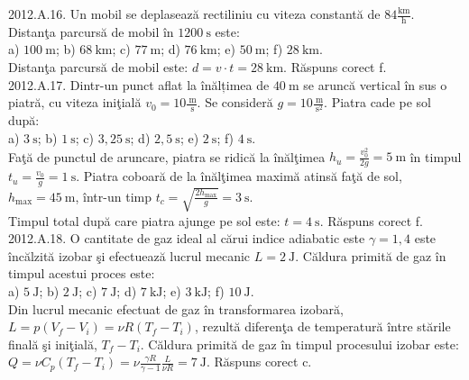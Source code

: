 2012.A.16. Un mobil se deplasează rectiliniu cu viteza constantă de $84 \frac{\mathrm{km}}{\mathrm{h}}$. Distanţa parcursă de mobil în $1200 \mathrm{~s}$ este:\\ a) $100 \mathrm{~m}$; b) $68 \mathrm{~km}$; c) $77 \mathrm{~m}$; d) $76 \mathrm{~km}$; e) $50 \mathrm{~m}$; f) $28 \mathrm{~km}$.\\ Distanţa parcursă de mobil este: $d=v \cdot t=28 \mathrm{~km}$. Răspuns corect f.\\

2012.A.17. Dintr-un punct aflat la înălțimea de $40 \mathrm{~m}$ se aruncă vertical în sus o piatră, cu viteza iniţială $v_{0}=10 \frac{\mathrm{~m}}{\mathrm{~s}}$. Se consideră $g=10 \frac{\mathrm{~m}}{\mathrm{~s}^{2}}$. Piatra cade pe sol după:\\ a) $3 \mathrm{~s}$; b) $1 \mathrm{~s}$; c) $3,25 \mathrm{~s}$; d) $2,5 \mathrm{~s}$; e) $2 \mathrm{~s}$; f) $4 \mathrm{~s}$.\\ Faţă de punctul de aruncare, piatra se ridică la înălţimea $h_{u}=\frac{v_{0}^{2}}{2 g}=5 \mathrm{~m}$ în timpul $t_{u}=\frac{v_{0}}{g}=1 \mathrm{~s}$. Piatra coboară de la înălţimea maximă atinsă faţă de sol, $h_{\max}=45 \mathrm{~m}$, într-un timp $t_{c}=\sqrt{\frac{2 h_{\max}}{g}}=3 \mathrm{~s}$.\\ Timpul total după care piatra ajunge pe sol este: $t=4 \mathrm{~s}$. Răspuns corect f.\\

2012.A.18. O cantitate de gaz ideal al cărui indice adiabatic este $\gamma=1,4$ este încălzită izobar şi efectuează lucrul mecanic $L=2 \mathrm{~J}$. Căldura primită de gaz în timpul acestui proces este:\\ a) $5 \mathrm{~J}$; b) $2 \mathrm{~J}$; c) $7 \mathrm{~J}$; d) $7 \mathrm{~kJ}$; e) $3 \mathrm{~kJ}$; f) $10 \mathrm{~J}$.\\ Din lucrul mecanic efectuat de gaz în transformarea izobară, $L=p\left(V_{f}-V_{i}\right)=\nu R\left(T_{f}-T_{i}\right)$, rezultă diferenţa de temperatură între stările finală şi iniţială, $T_{f}-T_{i}$. Căldura primită de gaz în timpul procesului izobar este:\\ $Q=\nu C_{p}\left(T_{f}-T_{i}\right)=\nu \frac{\gamma R}{\gamma-1} \frac{L}{\nu R}=7 \mathrm{~J}$. Răspuns corect c.\\

